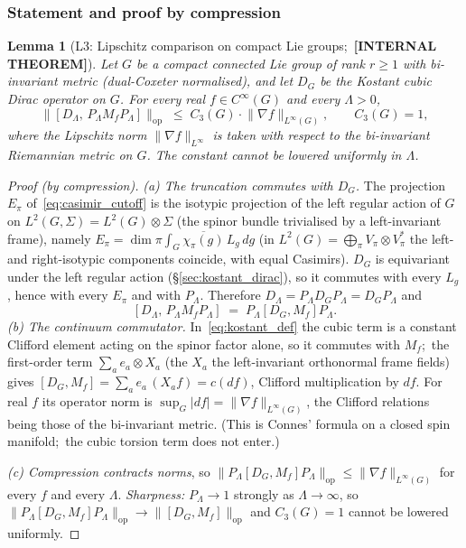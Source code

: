 \documentclass[11pt,a4paper]{article}
\theoremstyle{plain}
\newtheorem{lemma}[theorem]{Lemma}
\theoremstyle{definition}
\newcommand{\Lammax}{\Lambda}
\newcommand{\opnorm}[1]{\lVert #1 \rVert_{\mathrm{op}}}
\newcommand{\norm}[1]{\lVert #1 \rVert}
\newcommand{\Dop}{D}
\begin{document}
\subsubsection{Statement and proof by compression}\label{sec:L3_statement}

\begin{lemma}[L3: Lipschitz comparison on compact Lie groups;\
\textbf{[INTERNAL THEOREM]}]\label{lem:L3}
Let $G$ be a compact connected Lie group of rank $r \ge 1$ with
bi-invariant metric (dual-Coxeter normalised), and let $\Dop_G$ be the
Kostant cubic Dirac operator on $G$. For every real $f \in C^\infty(G)$
and every $\Lammax > 0$,
\begin{equation}\label{eq:L3_main_general}
   \opnorm{[\Dop_\Lammax,\, P_\Lammax M_f P_\Lammax]}
   \;\le\; C_3(G) \cdot \norm{\nabla f}_{L^\infty(G)}, \qquad C_3(G) = 1,
\end{equation}
where the Lipschitz norm $\norm{\nabla f}_{L^\infty}$ is taken with
respect to the bi-invariant Riemannian metric on $G$.  The constant
cannot be lowered uniformly in $\Lammax$.
\end{lemma}

\begin{proof}[Proof (by compression)]
\emph{(a) The truncation commutes with $\Dop_G$.}  The projection
$E_\pi$ of~\eqref{eq:casimir_cutoff} is the isotypic projection of the
left regular action of $G$ on $L^2(G, \Sigma) = L^2(G) \otimes \Sigma$
(the spinor bundle trivialised by a left-invariant frame), namely
$E_\pi = \dim \pi \int_G \overline{\chi_\pi(g)}\, L_g\, dg$ (in
$L^2(G) = \bigoplus_\pi V_\pi \otimes V_\pi^*$ the left- and right-isotypic
components coincide, with equal Casimirs).  $\Dop_G$ is equivariant
under the left regular action (\S\ref{sec:kostant_dirac}), so it
commutes with every $L_g$, hence with every $E_\pi$ and with
$P_\Lammax$.  Therefore $\Dop_\Lammax = P_\Lammax \Dop_G P_\Lammax =
\Dop_G P_\Lammax$ and
\[
   [\Dop_\Lammax,\, P_\Lammax M_f P_\Lammax] \;=\;
   P_\Lammax [\Dop_G, M_f] P_\Lammax .
\]
\emph{(b) The continuum commutator.}  In~\eqref{eq:kostant_def} the
cubic term is a constant Clifford element acting on the spinor factor
alone, so it commutes with $M_f$;\ the first-order term
$\sum_a e_a \otimes X_a$ (the $X_a$ the left-invariant orthonormal
frame fields) gives $[\Dop_G, M_f] = \sum_a e_a\, (X_a f) =
c(df)$, Clifford multiplication by $df$.  For real $f$ its operator norm
is $\sup_G |df| = \norm{\nabla f}_{L^\infty(G)}$, the Clifford relations
being those of the bi-invariant metric.  (This is Connes' formula on a
closed spin manifold;\ the cubic torsion term does not enter.)

\emph{(c) Compression contracts norms}, so
$\opnorm{P_\Lammax [\Dop_G, M_f] P_\Lammax} \le \norm{\nabla
f}_{L^\infty(G)}$ for every $f$ and every $\Lammax$.  \emph{Sharpness:}
$P_\Lammax \to 1$ strongly as $\Lammax \to \infty$, so
$\opnorm{P_\Lammax [\Dop_G, M_f] P_\Lammax} \to \opnorm{[\Dop_G, M_f]}$
and $C_3(G) = 1$ cannot be lowered uniformly.
\end{proof}
\end{document}
